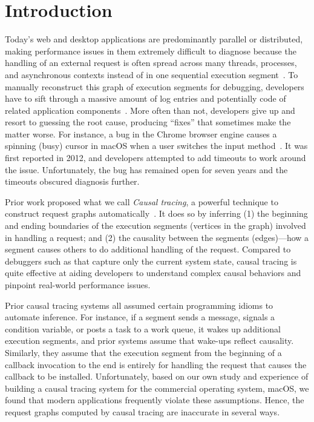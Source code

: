 \section{Introduction} \label{sec:intro}

Today's web and desktop applications are predominantly parallel or distributed,
making performance issues in them extremely difficult to diagnose because the
handling of an external request is often spread across many threads, processes,
and asynchronous contexts instead of in one sequential execution
segment~\cite{harter2012file}. To manually reconstruct this graph of execution
segments for debugging, developers have to sift through a massive amount of log
entries and potentially code of related application
components~\cite{chen2002pinpoint, zhao2016non, xu2009detecting,
nagaraj2012structured, yuan2012conservative}. More often than not, developers
give up and resort to guessing the root cause, producing ``fixes'' that
sometimes make the matter worse. For instance, a bug in the Chrome browser
engine causes a spinning (busy) cursor in macOS when a user switches the input
method~\cite{chromiumbugreport}. It was first reported in 2012, and developers
attempted to add timeouts to work around the issue. Unfortunately, the bug has
remained open for seven years and the timeouts obscured diagnosis further.

Prior work proposed what we call \emph{Causal tracing}, a powerful technique to
construct request graphs automatically~\cite{reynolds2006pip, fonseca2007x,
benjamin2010dapper, zhang2013panappticon, ravindranath2012appinsight}.  It does
so by inferring (1) the beginning and ending boundaries of the execution
segments (vertices in the graph) involved in handling a request; and (2) the
causality between the segments (edges)---how a segment causes others to do
additional handling of the request.  Compared to debuggers such as \spindump
that capture only the current system state, causal tracing is quite effective
at aiding developers to understand complex causal behaviors and pinpoint
real-world performance issues.

Prior causal tracing systems all assumed certain programming idioms to automate
inference. For instance, if a segment sends a message, signals a condition
variable, or posts a task to a work queue, it wakes up additional execution
segments, and prior systems assume that wake-ups reflect causality. Similarly,
they assume that the execution segment from the beginning of a callback
invocation to the end is entirely for handling the request that causes the
callback to be installed.  Unfortunately, based on our own study and experience
of building a causal tracing system for the commercial operating system, macOS,
we found that modern applications frequently violate these assumptions. Hence,
the request graphs computed by causal tracing are inaccurate in several ways.

